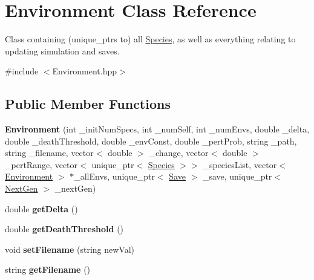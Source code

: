 \hypertarget{classEnvironment}{}\section{Environment Class Reference}
\label{classEnvironment}


Class containing (unique\+\_\+ptrs to) all \hyperlink{classSpecies}{Species}, as well as everything relating to updating simulation and saves.  




{\ttfamily \#include $<$Environment.\+hpp$>$}

\subsection*{Public Member Functions}
\begin{DoxyCompactItemize}
\item 
\hypertarget{classEnvironment_ac4921c1240e7674ac81860afb5df0272}{}\label{classEnvironment_ac4921c1240e7674ac81860afb5df0272} 
{\bfseries Environment} (int \+\_\+init\+Num\+Specs, int \+\_\+num\+Self, int \+\_\+num\+Envs, double \+\_\+delta, double \+\_\+death\+Threshold, double \+\_\+env\+Const, double \+\_\+pert\+Prob, string \+\_\+path, string \+\_\+filename, vector$<$ double $>$ \+\_\+change, vector$<$ double $>$ \+\_\+pert\+Range, vector$<$ unique\+\_\+ptr$<$ \hyperlink{classSpecies}{Species} $>$$>$ \+\_\+species\+List, vector$<$ \hyperlink{classEnvironment}{Environment} $>$ $\ast$\+\_\+all\+Envs, unique\+\_\+ptr$<$ \hyperlink{classSave}{Save} $>$ \+\_\+save, unique\+\_\+ptr$<$ \hyperlink{classNextGen}{Next\+Gen} $>$ \+\_\+next\+Gen)
\item 
\hypertarget{classEnvironment_a58c5fa5e6b682d47fd22f1475410266d}{}\label{classEnvironment_a58c5fa5e6b682d47fd22f1475410266d} 
double {\bfseries get\+Delta} ()
\item 
\hypertarget{classEnvironment_a14802408594d924c478c7a102706a32e}{}\label{classEnvironment_a14802408594d924c478c7a102706a32e} 
double {\bfseries get\+Death\+Threshold} ()
\item 
\hypertarget{classEnvironment_a0451300ebededfab5643fbfc8b3fa114}{}\label{classEnvironment_a0451300ebededfab5643fbfc8b3fa114} 
void {\bfseries set\+Filename} (string new\+Val)
\item 
\hypertarget{classEnvironment_abedd295a12a1e2f3c1b5823ca03018c8}{}\label{classEnvironment_abedd295a12a1e2f3c1b5823ca03018c8} 
string {\bfseries get\+Filename} ()
\item 
$$
\end{DoxyCompactItemize}
